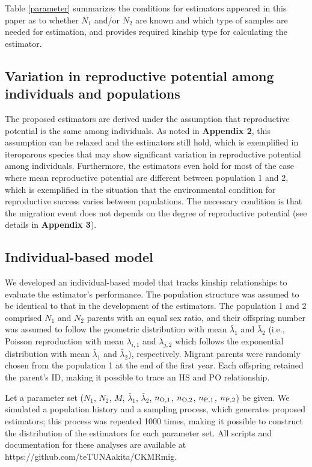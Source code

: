 \documentclass[12pt, English]{article}
\begin{document}
\begin{spacing}{1.9}
Table \ref{parameter} summarizes the conditions for estimators appeared in this paper as to whether $N_1$ and/or $N_2$ are known and which type of samples are needed for estimation, and provides required kinship type for calculating the estimator. 

\subsection{Variation in reproductive potential among individuals and populations}

The proposed estimators are derived under the assumption that reproductive potential is the same among individuals. As noted in {\bf Appendix 2}, this assumption can be relaxed and the estimators still hold, which is exemplified in iteroparous species that may show significant variation in reproductive potential among individuals. Furthermore, the estimators even hold for most of the case where mean reproductive potential are different between population 1 and 2, which is exemplified in the situation that the environmental condition for reproductive success varies between populations. The necessary condition is that the migration event does not depends on the degree of reproductive potential (see details in  {\bf Appendix 3}). 

\subsection{Individual-based model}

We developed an individual-based model that tracks kinship relationships to evaluate the estimator's performance. The population structure was assumed to be identical to that in the development of the estimators. The population 1 and 2 comprised $N_1$ and $N_2$ parents with an equal sex ratio, and their offspring number was assumed to follow the geometric distribution with mean ${\bar \lambda_1}$ and ${\bar \lambda_2}$ (i.e., Poisson reproduction with mean $\lambda_{i,1}$ and $\lambda_{j,2}$ which follows the exponential distribution with mean ${\bar \lambda_1}$ and ${\bar \lambda_2}$), respectively. Migrant parents were randomly chosen from the population 1 at the end of the first year. Each offspring retained the parent's ID, making it possible to trace an HS and PO relationship.

Let a parameter set ($N_1$, $N_2$, $M$, ${\bar \lambda_1}$, ${\bar \lambda_2}$, $n_{\rm O,1}$, $n_{\rm O,2}$, $n_{\rm P,1}$, $n_{\rm P,2}$) be given. We simulated a population history and a sampling process, which generates proposed estimators; this process was repeated 1000 times, making it possible to construct the distribution of the estimators for each parameter set. All scripts and documentation for these analyses are available at \\https://github.com/teTUNAakita/CKMRmig.


\end{spacing}
\end{document}
